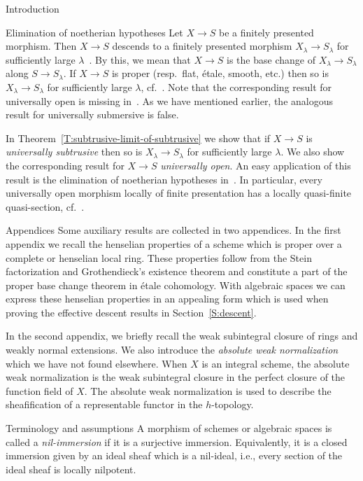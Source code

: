 \documentclass[a4paper,twoside,11pt]{amsart}[2009/07/02] %
\newcommand{\pref}[1]{\eqref{#1}}
\newcommand{\etale}{\'{e}tale}
\begin{document}
\begin{section}{Introduction}
\begin{subsection}{Elimination of noetherian hypotheses}
Let $X\to S$ be a finitely presented morphism. Then $X\to S$ descends to a
finitely presented morphism $X_\lambda\to S_\lambda$ for sufficiently large
$\lambda$~\cite[Thm.~8.8.2]{egaIV}. By this, we mean that $X\to S$ is
the base change of $X_\lambda\to S_\lambda$ along $S\to S_\lambda$.
%
If $X\to S$ is proper (resp.\ flat, \etale{}, smooth, etc.) then so is
$X_\lambda\to S_\lambda$ for sufficiently large $\lambda$,
cf.~\cite[Thm.~8.10.5, Thm.~11.2.6, Prop.~17.7.8]{egaIV}. Note that the
corresponding result for universally open is missing in~\cite{egaIV}. As we
have mentioned earlier, the analogous result for universally submersive is
false.

In Theorem~\pref{T:subtrusive-limit-of-subtrusive} we show that if $X\to S$ is
\emph{universally subtrusive} then so is $X_\lambda\to S_\lambda$ for
sufficiently large $\lambda$. We also show the corresponding result for $X\to
S$ \emph{universally open}. An easy application of this result is the
elimination of noetherian hypotheses in~\cite[\S\S14--15]{egaIV}. In
particular, every universally open morphism locally of finite presentation has
a locally quasi-finite quasi-section, cf.~\cite[Prop.~14.5.10]{egaIV}.
\end{subsection}

\begin{subsection}{Appendices}
Some auxiliary results are collected in two appendices. In the first appendix
we recall the henselian properties of a scheme which is proper over a complete
or henselian local ring. These properties follow from the Stein factorization
and Grothendieck's existence theorem and constitute a part of the proper base
change theorem in \etale{} cohomology. With algebraic spaces we can express
these henselian properties in an appealing form which is used when proving the
effective descent results in Section~\ref{S:descent}.

In the second appendix, we briefly recall the weak subintegral closure of rings
and weakly normal extensions. We also introduce the \emph{absolute weak
normalization} which we have not found elsewhere. When $X$ is an integral
scheme, the absolute weak normalization is the weak subintegral closure in the
perfect closure of the function field of $X$. The absolute weak normalization
is used to describe the sheafification of a representable functor in the
$h$-topology.
\end{subsection}

\begin{subsection}{Terminology and assumptions}
A morphism of schemes or algebraic spaces is called a \emph{nil-immersion} if
it is a surjective immersion. Equivalently, it is a closed immersion given by
an ideal sheaf which is a nil-ideal, i.e., every section of the ideal sheaf is
locally nilpotent.


\end{subsection}
\end{section}
\end{document}
